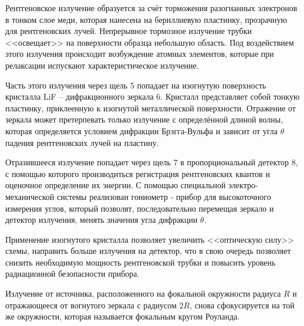 \documentclass[a4paper, 12pt]{article}%
\begin{document}
		Рентгеновское излучение образуется за счёт торможения разогнанных электронов в тонком слое меди,  которая нанесена на бериллиевую пластинку,  прозрачную для рентгеновских лучей.  Непрерывное тормозное излучение трубки <<освещает>> на поверхности образца небольшую область.  Под воздействием этого излучения происходит возбуждение атомных элементов,  которые при релаксации испускают характеристическое излучение.  
				
		Часть этого излучения через щель 5 попадает на изогнутую поверхность кристалла LiF -- дифракционного зеркала 6.  Кристалл представляет собой тонкую пластинку,  приклеенную к изогнутой металлической поверхности.  Отражение от зеркала может претерпевать только излучение с определённой длиной волны,  которая определяется условием дифракции Брэгга-Вульфа и зависит от угла $\theta$ падения рентгеновских лучей на пластину. 
				
		Отразившееся излучение попадает через щель 7 в пропорциональный детектор 8,  с помощью которого производиться регистрация рентгеновских квантов и оценочное определение их энергии.  С помощью специальной электро-механической системы реализован гониометр - прибор для высокоточного измерения углов,  который позволят,  последовательно перемещая зеркало и детектор излучения,  менять значения угла дифракции $\theta$. 
				
		Применение изогнутого кристалла позволяет увеличить <<оптическую силу>> схемы,  направить больше излучения на детектор,  что в свою очередь позволяет снизить необходимую мощность рентгеновской трубки и повысить уровень радиационной безопасности прибора.  
				
		Излучение от источника,  расположенного на фокальной окружности радиуса $R$ и отражающееся от вогнутого зеркала с радиусом $2R$,  снова сфокусируется на той же окружности,  которая называется фокальным кругом Роуланда.  
				
\end{document}
